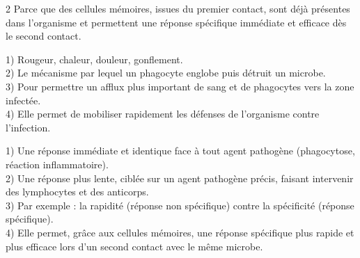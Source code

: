\begin{multicols}{2}
Parce que des cellules mémoires, issues du premier contact, sont déjà présentes dans
l'organisme et permettent une réponse spécifique immédiate et efficace dès le second
contact.

1) Rougeur, chaleur, douleur, gonflement.\\
2) Le mécanisme par lequel un phagocyte englobe puis détruit un microbe.\\
3) Pour permettre un afflux plus important de sang et de phagocytes vers la zone
infectée.\\
4) Elle permet de mobiliser rapidement les défenses de l'organisme contre
l'infection.

1) Une réponse immédiate et identique face à tout agent pathogène (phagocytose,
réaction inflammatoire).\\
2) Une réponse plus lente, ciblée sur un agent pathogène précis, faisant intervenir
des lymphocytes et des anticorps.\\
3) Par exemple : la rapidité (réponse non spécifique) contre la spécificité (réponse
spécifique).\\
4) Elle permet, grâce aux cellules mémoires, une réponse spécifique plus rapide et
plus efficace lors d'un second contact avec le même microbe.

\end{multicols}
\exercicesBanner
